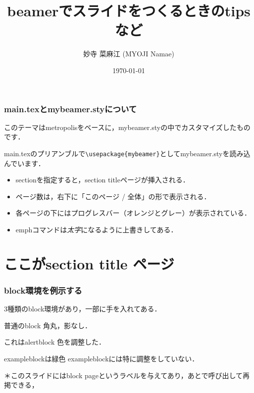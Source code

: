 \documentclass[unicode, 9pt, aspectratio=169]{beamer}
\title{beamerでスライドをつくるときのtipsなど}
\author{妙寺 菜麻江 (MYOJI Namae)}
\institute{所属，institute}
\date{\today}
\begin{document}

\maketitle

\begin{frame}[containsverbatim] %
\frametitle{main.texとmybeamer.styについて}
このテーマはmetropolisをベースに，mybeamer.styの中でカスタマイズしたものです．

main.texのプリアンブルで\verb+\usepackage{mybeamer}+としてmybeamer.styを読み込んでいます．

\begin{block}{}
\begin{itemize}
    \item sectionを指定すると，section titleページが挿入される．
    \item ページ数は，右下に「このページ / 全体」の形で表示される．
    \item 各ページの下にはプログレスバー（オレンジとグレー）が表示されている．
    \item emphコマンドは\emph{太字}になるように上書きしてある．
\end{itemize}
\end{block}
\end{frame}

\section{ここがsection title ページ}

\begin{frame}[label=block page] %
\frametitle{block環境を例示する}
3種類のblock環境があり，一部に手を入れてある．
\begin{block}{普通のblock}
    角丸，影なし．
\end{block}

\begin{alertblock}{これはalertblock}
    色を調整した．
\end{alertblock}

\begin{exampleblock}{exampleblockは緑色}
    exampleblockには特に調整をしていない．
\end{exampleblock}

＊このスライドにはblock pageというラベルを与えてあり，あとで呼び出して再掲できる，
\end{frame}
\end{document}

